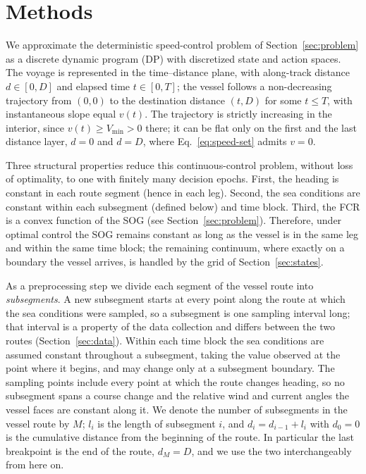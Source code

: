 \documentclass[review,authoryear]{elsarticle}
\begin{document}
\section{Methods}
\label{sec:methods}

We approximate the deterministic speed-control problem of Section~\ref{sec:problem} as a discrete
dynamic program (DP) with discretized state and action spaces. The voyage is represented in the time--distance plane, with
along-track distance $d\in[0,D]$ and elapsed time $t\in[0,T]$; the vessel follows a non-decreasing
trajectory from $(0,0)$ to the destination distance $(t,D)$ for some $t\leq T$, with instantaneous slope equal $v(t)$.
The trajectory is strictly increasing in the interior, since $v(t)\ge V_{\min}>0$ there; it can be flat
only on the first and the last distance layer, $d=0$ and $d=D$, where Eq.~\eqref{eq:speed-set} admits
$v=0$.

Three structural properties reduce this continuous-control problem, without loss of optimality, to
one with finitely many decision epochs. First, the heading is constant in each route segment (hence
in each leg). Second, the sea conditions are constant within each subsegment (defined below) and time block.
Third, the FCR is a convex function of the SOG (see Section~\ref{sec:problem}).
Therefore, under optimal control the SOG remains constant as long as the vessel is in the same leg and within the same time block; the remaining continuum, where exactly on a boundary the vessel arrives, is handled by the grid of Section~\ref{sec:states}.

As a preprocessing step we divide each segment of the vessel route into \emph{subsegments}. A new subsegment starts at every point along the route at which the sea conditions were sampled, so a subsegment is one sampling interval long; that interval is a property of the data collection and differs between the two routes (Section~\ref{sec:data}). Within each time block the sea conditions are assumed constant throughout a subsegment, taking the value observed at the point where it begins, and may change only at a subsegment boundary. The sampling points include every point at which the route changes heading, so no subsegment spans a course change and the relative wind and current angles the vessel faces are constant along it. We denote the number of subsegments in the vessel route by $M$; $l_i$ is the length of subsegment $i$, and $d_i = d_{i-1} + l_{i}$ with $d_0 = 0$ is the cumulative distance from the beginning of the route. In particular the last breakpoint is the end of the route, $d_M = D$, and we use the two interchangeably from here on.
\end{document}
